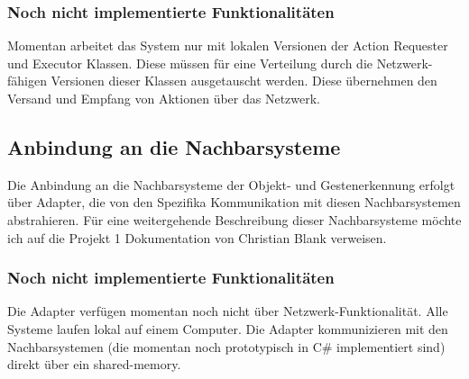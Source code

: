 \subsubsection{Noch nicht implementierte Funktionalitäten}

Momentan arbeitet das System nur mit lokalen Versionen der Action Requester und Executor Klassen. Diese müssen für eine Verteilung durch die Netzwerk-fähigen Versionen dieser Klassen ausgetauscht werden. Diese übernehmen den Versand und Empfang von Aktionen über das Netzwerk.

\subsection{Anbindung an die Nachbarsysteme}

Die Anbindung an die Nachbarsysteme der Objekt- und Gestenerkennung erfolgt über Adapter, die von den Spezifika Kommunikation mit diesen Nachbarsystemen abstrahieren. Für eine weitergehende Beschreibung dieser Nachbarsysteme möchte ich auf die Projekt 1 Dokumentation von Christian Blank verweisen.


\subsubsection{Noch nicht implementierte Funktionalitäten}

Die Adapter verfügen momentan noch nicht über Netzwerk-Funktionalität. Alle Systeme laufen lokal auf einem Computer. Die Adapter kommunizieren mit den Nachbarsystemen (die momentan noch prototypisch in C\# implementiert sind) direkt über ein shared-memory.